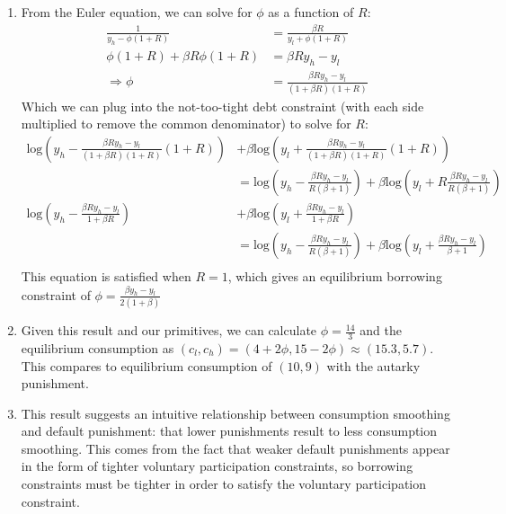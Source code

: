 \documentclass{article}
\newcommand{\loge}[1]{\text{log}\left(#1\right)}
\begin{document}
\begin{enumerate}
	\item From the Euler equation, we can solve for $\phi$ as a function of $R$:
		\begin{align*}
			\frac{1}{y_h - \phi(1+R)} 		&= \frac{\beta R}{y_l + \phi(1+R)}			\\
			\phi(1+R) + \beta R\phi(1+R) 	&= \beta Ry_h-y_l							\\
			\Rightarrow \phi				&= \frac{\beta R y_h-y_l}{(1+\beta R)(1+R)}
		\end{align*}
		Which we can plug into the not-too-tight debt constraint (with each side multiplied to remove the common denominator) to solve for $R$:
		{\small \begin{align*}
			\loge{y_h-\frac{\beta R y_h-y_l}{(1+\beta R)(1+R)}(1+R)} &+ \beta\loge{y_l +\frac{\beta R y_h-y_l}{(1+\beta R)(1+R)}(1+R)} 	\\
													&= \loge{y_h-\frac{\beta R y_h-y_l}{R(\beta+1)}} + \beta\loge{y_l + R\frac{\beta R y_h-y_l}{R(\beta+1)}}	\\
			\loge{y_h-\frac{\beta R y_h-y_l}{1+\beta R}} &+ \beta\loge{y_l +\frac{\beta R y_h-y_l}{1+\beta R}} 	\\
													&= \loge{y_h-\frac{\beta R y_h-y_l}{R(\beta+1)}} + \beta\loge{y_l + \frac{\beta R y_h-y_l}{\beta+1}}	\\
		\end{align*} }
		This equation is satisfied when $R=1$, which gives an equilibrium borrowing constraint of ${\phi=\frac{\beta y_h-y_l}{2(1+\beta)}}$
		
	\item Given this result and our primitives, we can calculate ${\phi=\frac{14}{3}}$ and the equilibrium consumption as ${(c_l,c_h)=\left(4 +2\phi,15-2\phi\right)\approx\left(15.3,5.7\right)}$. This compares to equilibrium consumption of ${(10,9)}$ with the autarky punishment.
	
	\item This result suggests an intuitive relationship between consumption smoothing and default punishment: that lower punishments result to less consumption smoothing. This comes from the fact that weaker default punishments appear in the form of tighter voluntary participation constraints, so borrowing constraints must be tighter in order to satisfy the voluntary participation constraint. 
	
\end{enumerate}

\end{document}
